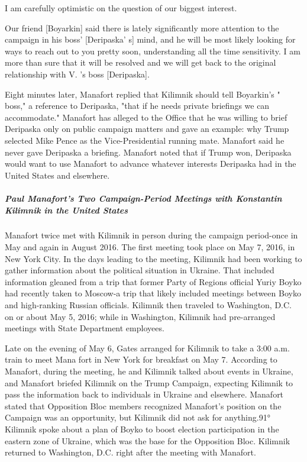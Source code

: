 I am carefully optimistic on the question of our biggest interest.

Our friend [Boyarkin] said there is lately significantly more attention to the campaign in his boss' [Deripaska' s] mind, and he will be most likely looking for ways to reach out to you pretty soon, understanding all the time sensitivity. I am more than sure that it will be resolved and we will get back to the original relationship with V. 's boss [Deripaska].%

Eight minutes later, Manafort replied that Kilimnik should tell Boyarkin's " boss," a reference to Deripaska, "that if he needs private briefings we can accommodate."%
Manafort has alleged to the Office that he was willing to brief Deripaska only on public campaign matters and gave an example: why Trump selected Mike Pence as the Vice-Presidential running mate.%
Manafort said he never gave Deripaska a briefing.%
Manafort noted that if Trump won, Deripaska would want to use Manafort to advance whatever interests Deripaska had in the United States and elsewhere.%

\subparagraph{Paul Manafort's Two Campaign-Period Meetings with Konstantin Kilimnik in the United States}

Manafort twice met with Kilimnik in person during the campaign period-once in May and again in August 2016. The first meeting took place on May 7, 2016, in New York City.%
In the days leading to the meeting, Kilimnik had been working to gather information about the political situation in Ukraine. That included information gleaned from a trip that former Party of Regions official Yuriy Boyko had recently taken to Moscow-a trip that likely included meetings between Boyko and high-ranking Russian officials.%
Kilimnik then traveled to Washington, D.C. on or about May 5, 2016; while in Washington, Kilimnik had pre-arranged meetings with State Department employees.%

Late on the evening of May 6, Gates arranged for Kilimnik to take a 3:00 a.m. train to meet Mana fort in New York for breakfast on May 7. %
According to Manafort, during the meeting, he and Kilimnik talked about events in Ukraine, and Manafort briefed Kilimnik on the Trump Campaign, expecting Kilimnik to pass the information back to individuals in Ukraine and elsewhere.%
Manafort stated that Opposition Bloc members recognized Manafort's position on the Campaign was an opportunity, but Kilimnik did not ask for anything.91° Kilimnik spoke about a plan of Boyko to boost election participation in the eastern zone of Ukraine, which was the base for the Opposition Bloc.%
Kilimnik returned to Washington, D.C. right after the meeting with Manafort.

